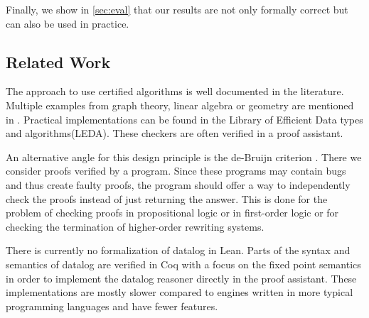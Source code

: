 Finally, we show in \cref{sec:eval} that our results are not only formally correct but can also be used in practice.

\subsection{Related Work}

The approach to use certified algorithms is well documented in the literature. Multiple examples from graph theory, linear algebra or geometry are mentioned in \cite{CertAlg}. Practical implementations can be found in the Library of Efficient Data types and algorithms(LEDA)\cite{Leda}. These checkers are often verified in a proof assistant\cite{CertCheckerWorkflow}.

An alternative angle for this design principle is the de-Bruijn criterion \cite{deBruijnCriterion}. There we consider proofs verified by a program. Since these programs may contain bugs and thus create faulty proofs, the program should offer a  way to independently check the proofs instead of just returning the answer. This is done for the problem of checking proofs in propositional logic\cite{deBruijnPropProof} or in first-order logic\cite{deBruijnFOProof} or for checking the termination of higher-order rewriting systems\cite{deBruijnRewriting}.

There is currently no formalization of datalog in Lean. Parts of the syntax and semantics of datalog are verified in Coq\cite{datalogCoq} with a focus on the fixed point semantics in order to implement the datalog reasoner directly in the proof assistant\cite{datalogCoq, regularDatalogCoq}. These implementations are mostly slower compared to engines written in more typical programming languages and have fewer features.